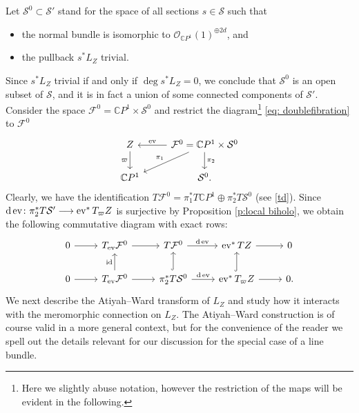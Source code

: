 \documentclass[pdftex]{sigma}
\numberwithin{equation}{section}
\theoremstyle{definition}
\newcommand\C{{\mathbb C}}
\begin{document}
Let $\mathcal S^0 \subset \mathcal S'$ stand for the space of all sections $s \in \mathcal S$ such that
\begin{itemize}\itemsep=0pt
\item the normal bundle is isomorphic to $\mathcal{O}_{\C P^1}(1)^{\oplus 2d}$, and

\item the pullback $s^*L_Z$ trivial.
\end{itemize}
Since $s^*L_Z$ trivial if and only if $\deg s^*L_Z = 0$, we conclude that
$\mathcal S^0$ is an open subset of $\mathcal S$, and it is in fact a union of some
connected components of $\mathcal S'$.
Consider the space $\mathcal F^0 = \C P^1 \times \mathcal S^0$ and restrict the diagram\footnote{Here we slightly abuse notation,
however the restriction of the maps will be evident in the following.} \eqref{eq: doublefibration} to $\mathcal F^0$
\begin{equation}\label{td}
\begin{tikzcd}
Z \arrow[r, leftarrow, "\operatorname{ev}"] \arrow[d, "\varpi"'] & {\mathcal F}^0 = \C P^1 \times \mathcal{S}^0 \arrow[dl, "\pi_1"'] \arrow[d, "\pi_2"] \\
\C P^1 & \mathcal{S}^0.
\end{tikzcd}
\end{equation}
Clearly, we have the identification
$
T\mathcal F^0 = \pi_1^*T\C P^1 \oplus \pi_2^*T\mathcal S^0
$
(see \eqref{td}). Since ${\rm d}\operatorname{ev}\colon \pi_2^*T\mathcal S' \longrightarrow \operatorname{ev}^*T_\varpi Z$
is surjective by Proposition \ref{p:local biholo}, we obtain the following commutative diagram with exact rows:
\begin{equation}\label{TFTS}
\begin{tikzcd}
0 \arrow[r] & T_{\operatorname{ev}}\mathcal F^0 \arrow[r] & T\mathcal F^0 \arrow[r,"{\rm d}\operatorname{ev}"] & \operatorname{ev}^*TZ \arrow[r] & 0\\
0 \arrow[r] & T_{\operatorname{ev}}\mathcal F^0 \arrow[u, "\mathrm{id}"]\arrow[r] & \pi_2^*T\mathcal S^0 \arrow[u, hookrightarrow] \arrow[r,"{\rm d}\operatorname{ev}"] &\arrow[u,hookrightarrow] \operatorname{ev}^*T_\varpi Z \arrow[r]& 0.
\end{tikzcd}
\end{equation}
We next describe the Atiyah--Ward transform of $L_Z$ \cite{AW,BaEa,Merkulov} and study how it interacts with the
meromorphic connection on $L_Z$. The Atiyah--Ward construction is of course valid in a more general
context, but for the convenience of the reader we spell out the details relevant for our discussion for the
special case of a line bundle.
\end{document}
